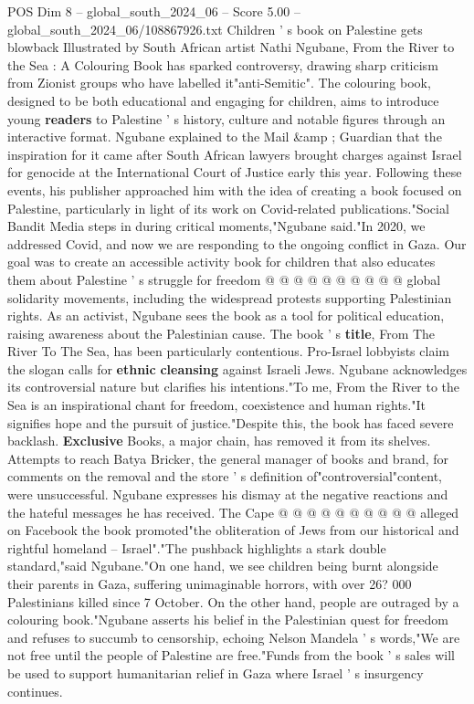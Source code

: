 \begin{textsample}{POS Dim 8 – global\_south\_2024\_06 – Score 5.00 – global\_south\_2024\_06/108867926.txt}  \label{ex:f8_pos_401}
Children ' s book on Palestine gets blowback Illustrated by South African artist Nathi Ngubane, From the River to the Sea : A Colouring Book has sparked controversy, drawing sharp criticism from Zionist groups who have labelled it"anti-Semitic".
The colouring book, designed to be both educational and engaging for children, aims to introduce young \textbf{readers} to Palestine ' s history, culture and notable figures through an interactive format.
Ngubane explained to the Mail \&amp ; Guardian that the inspiration for it came after South African lawyers brought charges against Israel for genocide at the International Court of Justice early this year.
Following these events, his publisher approached him with the idea of creating a book focused on Palestine, particularly in light of its work on Covid-related publications."Social Bandit Media steps in during critical moments,"Ngubane said."In 2020, we addressed Covid, and now we are responding to the ongoing conflict in Gaza.
Our goal was to create an accessible activity book for children that also educates them about Palestine ' s struggle for freedom @ @ @ @ @ @ @ @ @ @ global solidarity movements, including the widespread protests supporting Palestinian rights.
As an activist, Ngubane sees the book as a tool for political education, raising awareness about the Palestinian cause.
The book ' s \textbf{title}, From The River To The Sea, has been particularly contentious.
Pro-Israel lobbyists claim the slogan calls for \textbf{ethnic} \textbf{cleansing} against Israeli Jews.
Ngubane acknowledges its controversial nature but clarifies his intentions."To me, From the River to the Sea is an inspirational chant for freedom, coexistence and human rights."It signifies hope and the pursuit of justice."Despite this, the book has faced severe backlash. \textbf{Exclusive} Books, a major chain, has removed it from its shelves.
Attempts to reach Batya Bricker, the general manager of books and brand, for comments on the removal and the store ' s definition of"controversial"content, were unsuccessful.
Ngubane expresses his dismay at the negative reactions and the hateful messages he has received.
The Cape @ @ @ @ @ @ @ @ @ @ alleged on Facebook the book promoted"the obliteration of Jews from our historical and rightful homeland -- Israel"."The pushback highlights a stark double standard,"said Ngubane."On one hand, we see children being burnt alongside their parents in Gaza, suffering unimaginable horrors, with over 26? 000 Palestinians killed since 7 October.
On the other hand, people are outraged by a colouring book."Ngubane asserts his belief in the Palestinian quest for freedom and refuses to succumb to censorship, echoing Nelson Mandela ' s words,"We are not free until the people of Palestine are free."Funds from the book ' s sales will be used to support humanitarian relief in Gaza where Israel ' s insurgency continues.

\end{textsample}
